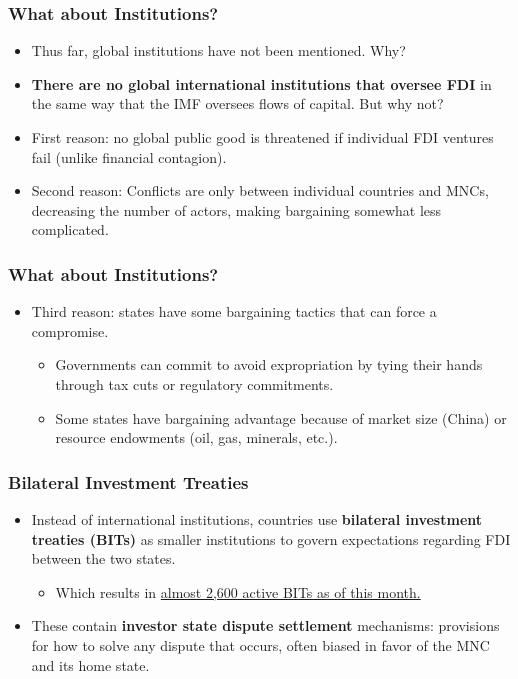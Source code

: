 \documentclass{beamer}
\begin{document}
\begin{frame} 
	\frametitle{\LARGE{What about Institutions?}}
	\begin{itemize}
		\item Thus far, global institutions have not been mentioned. Why? \pause 
		\item \textbf{There are no global international institutions that oversee FDI} in the same way that the IMF oversees flows of capital. But why not?
		\item First reason: no global public good is threatened if individual FDI ventures fail (unlike financial contagion). \pause 
		\item Second reason: Conflicts are only between individual countries and MNCs, decreasing the number of actors, making bargaining somewhat less complicated.  
		
	\end{itemize}
\end{frame}

\begin{frame} 
	\frametitle{\LARGE{What about Institutions?}}
	\begin{itemize}
		\item Third reason: states have some bargaining tactics that can force a compromise. \pause
		\begin{itemize}
			\item Governments can commit to avoid expropriation by tying their hands through tax cuts or regulatory commitments. \pause 
			\item Some states have bargaining advantage because of market size (China) or resource endowments (oil, gas, minerals, etc.).  
		\end{itemize}       
	\end{itemize}
\end{frame}

\begin{frame} 
	\frametitle{\LARGE{Bilateral Investment Treaties}}
	\begin{itemize}
		\item Instead of international institutions, countries use \textbf{bilateral investment treaties (BITs)} as smaller institutions to govern expectations regarding FDI between the two states. \pause 
		\begin{itemize}
			\item Which results in \href{https://investmentpolicy.unctad.org/international-investment-agreements/iia-mapping}{almost 2,600 active BITs as of this month.}
		\end{itemize}
		\item These contain \textbf{investor state dispute settlement} mechanisms: provisions for how to solve any dispute that occurs, often biased in favor of the MNC and its home state.	
	\end{itemize}
\end{frame}
\end{document}
